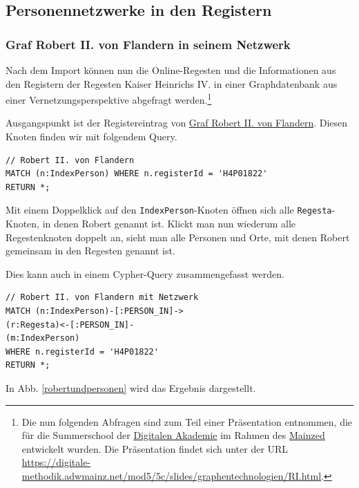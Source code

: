 \documentclass[ngerman,]{scrreprt}
\begin{document}
\hypertarget{personennetzwerke-in-den-registern}{%
\subsection{Personennetzwerke in den Registern}\label{personennetzwerke-in-den-registern}}

\hypertarget{graf-robert-ii.-von-flandern-in-seinem-netzwerk}{%
\subsubsection{Graf Robert II. von Flandern in seinem Netzwerk}\label{graf-robert-ii.-von-flandern-in-seinem-netzwerk}}

Nach dem Import können nun die Online-Regesten und die Informationen aus den Registern der Regesten Kaiser Heinrichs IV. in einer Graphdatenbank aus einer Vernetzungsperspektive abgefragt werden.\footnote{Die nun folgenden Abfragen sind zum Teil einer Präsentation entnommen, die für die Summerschool der \href{https://www.digitale-akademie.de}{Digitalen Akademie} im Rahmen des \href{https://www.mainzed.org/de}{Mainzed} entwickelt wurden. Die Präsentation findet sich unter der URL \url{https://digitale-methodik.adwmainz.net/mod5/5c/slides/graphentechnologien/RI.html}.}

Ausgangspunkt ist der Registereintrag von \href{https://de.wikipedia.org/wiki/Robert_II._(Flandern)}{Graf Robert II. von Flandern}. Diesen Knoten finden wir mit folgendem Query.

\begin{verbatim}
// Robert II. von Flandern
MATCH (n:IndexPerson) WHERE n.registerId = 'H4P01822'
RETURN *;
\end{verbatim}

Mit einem Doppelklick auf den \texttt{IndexPerson}-Knoten öffnen sich alle \texttt{Regesta}-Knoten, in denen Robert genannt ist. Klickt man nun wiederum alle Regestenknoten doppelt an, sieht man alle Personen und Orte, mit denen Robert gemeinsam in den Regesten genannt ist.

Dies kann auch in einem Cypher-Query zusammengefasst werden.

\begin{verbatim}
// Robert II. von Flandern mit Netzwerk
MATCH (n:IndexPerson)-[:PERSON_IN]->
(r:Regesta)<-[:PERSON_IN]-
(m:IndexPerson)
WHERE n.registerId = 'H4P01822'
RETURN *;
\end{verbatim}

In  Abb. \ref{robertundpersonen} wird das Ergebnis dargestellt.
\end{document}
